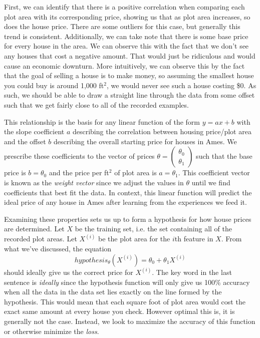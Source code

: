 First, we can identify that there is a positive correlation when comparing each
plot area with its corresponding price, showing us that as plot area increases,
so does the house price. There are some outliers for this case, but generally
this trend is consistent. Additionally, we can take note that there is some
base price for every house in the area. We can observe this with the fact that
we don't see any houses that cost a negative amount. That would just be
ridiculous and would cause an economic downturn. More intuitively, we can
observe this by the fact that the goal of selling a house is to make money, so
assuming the smallest house you could buy is around 1,000 ft$^2$, we would
never see such a house costing \$0. As such, we should be able to draw a
straight line through the data from some offset such that we get fairly close
to all of the recorded examples.

This relationship is the basis for any linear function of the form $y=ax + b$
with the slope coefficient $a$ describing the correlation between housing
price/plot area and the offset $b$ describing the overall starting price for
houses in Ames. We prescribe these coefficients to the vector of prices $\theta
= \begin{pmatrix}\theta_0 \\ \theta_1\end{pmatrix}$ such that the base price is
$b = \theta_0$ and the price per ft$^2$ of plot area is $a=\theta_1$. This
coefficient vector is known as the \emph{weight vector} since we adjust the
values in $\theta$ until we find coefficients that best fit the data. In
context, this linear function will predict the ideal price of any house in
Ames after learning from the experiences we feed it.

Examining these properties sets us up to form a hypothesis for how house prices
are determined. Let $X$ be the training set, i.e. the set containing all of the
recorded plot areas. Let $X^{(i)}$ be the plot area for the $i$th feature in
$X$. From what we've discussed, the equation
\begin{equation}
    hypothesis_{\theta}(X^{(i)}) = \theta_0 + \theta_1X^{(i)}
\end{equation}
should ideally give us the correct price for $X^{(i)}$. The key word in the last
sentence is \emph{ideally} since the hypothesis function will only give us 100\%
accuracy when all the data in the data set lies exactly on the line formed by
the hypothesis. This would mean that each square foot of plot area would cost
the exact same amount at every house you check. However optimal this is, it is
generally not the case. Instead, we look to maximize the accuracy of this
function or otherwise minimize the \emph{loss}.



